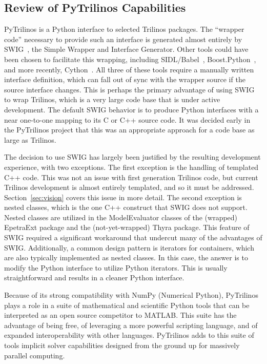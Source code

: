 \documentclass[11pt]{article}
\begin{document}
\subsection{Review of PyTrilinos Capabilities}
\label{sec:capabilities}

PyTrilinos is a Python interface to selected Trilinos packages.  The ``wrapper code'' necessary to provide such an interface is generated almost entirely by SWIG~\cite{SWIG_CXX_Python}, the Simple Wrapper and Interface Generator.  Other tools could have been chosen to facilitate this wrapping, including SIDL/Babel~\cite{Babel}, Boost.Python~\cite{BoostPython}, and more recently, Cython~\cite{Cython}.  All three of these tools require a manually written interface definition, which can fall out of sync with the wrapper source if the source interface changes.  This is perhaps the primary advantage of using SWIG to wrap Trilinos, which is a very large code base that is under active development.  The default SWIG behavior is to produce Python interfaces with a near one-to-one mapping to its C or C++ source code.  It was decided early in the PyTrilinos project that this was an appropriate approach for a code base as large as Trilinos.

The decision to use SWIG has largely been justified by the resulting development experience, with two exceptions.  The first exception is the handling of templated C++ code.  This was not an issue with first generation Trilinos code, but current Trilinos development is almost entirely templated, and so it must be addressed.  Section~\ref{sec:vision} covers this issue in more detail.  The second exception is nested classes, which is the one C++ construct that SWIG does not support.  Nested classes are utilized in the ModelEvaluator classes of the (wrapped) EpetraExt package and the (not-yet-wrapped) Thyra package.  This feature of SWIG required a significant workaround that undercut many of the advantages of SWIG.  Additionally, a common design pattern is iterators for containers, which are also typically implemented as nested classes.  In this case, the answer is to modify the Python interface to utilize Python iterators.  This is usually straightforward and results in a cleaner Python interface.

Because of its strong compatibility with NumPy (Numerical Python), PyTrilinos plays a role in a suite of mathematical and scientific Python tools that can be interpreted as an open source competitor to MATLAB.  This suite has the advantage of being free, of leveraging a more powerful scripting language, and of expanded interoperability with other languages.  PyTrilinos adds to this suite of tools implicit solver capabilities designed from the ground up for massively parallel computing.
\end{document}
